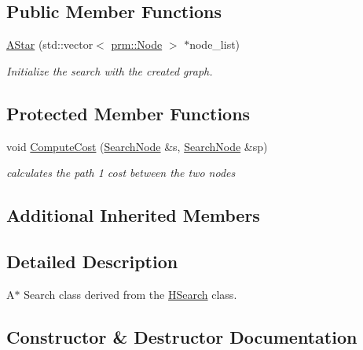 \subsection*{Public Member Functions}
\begin{DoxyCompactItemize}
\item 
\hyperlink{classhsearch_1_1AStar_ad3897420abd92fefbd9e9270689418b8}{A\+Star} (std\+::vector$<$ \hyperlink{structprm_1_1Node}{prm\+::\+Node} $>$ $\ast$node\+\_\+list)
\begin{DoxyCompactList}\small\item\em Initialize the search with the created graph. \end{DoxyCompactList}\end{DoxyCompactItemize}
\subsection*{Protected Member Functions}
\begin{DoxyCompactItemize}
\item 
void \hyperlink{classhsearch_1_1AStar_a3a9a3c398437d9efe0b9943c29a8672b}{Compute\+Cost} (\hyperlink{structhsearch_1_1SearchNode}{Search\+Node} \&s, \hyperlink{structhsearch_1_1SearchNode}{Search\+Node} \&sp)
\begin{DoxyCompactList}\small\item\em calculates the path 1 cost between the two nodes \end{DoxyCompactList}\end{DoxyCompactItemize}
\subsection*{Additional Inherited Members}


\subsection{Detailed Description}
A$\ast$ Search class derived from the \hyperlink{classhsearch_1_1HSearch}{H\+Search} class. 

\subsection{Constructor \& Destructor Documentation}
\mbox{\label{classhsearch_1_1AStar_ad3897420abd92fefbd9e9270689418b8}} 
